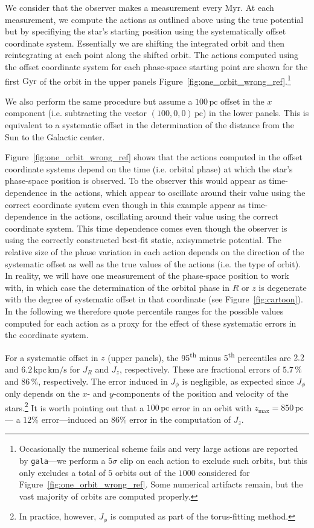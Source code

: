\documentclass[twocolumn]{aastex62}
\newcommand{\pc}{\text{pc}}
\newcommand{\Myr}{\text{Myr}}
\newcommand{\Gyr}{\text{Gyr}}
\newcommand{\kms}{\text{km}/\text{s}}
\newcommand{\actunit}{\text{kpc}\,\kms}
\begin{document}
We consider that the observer makes a measurement every $\Myr$. At
each measurement, we compute the actions as outlined above using the true
potential but by specifiying the star's starting position using the
systematically offset coordinate system. Essentially we are shifting the
integrated orbit and then reintegrating at each point along the shifted orbit. The actions computed using the offset coordinate system
for each phase-space starting point are shown for the first $\Gyr$ of the
orbit in the upper panels
Figure~\ref{fig:one_orbit_wrong_ref}.\footnote{Occasionally the numerical
scheme fails and very large actions are reported by \texttt{gala}---we perform
a $5\sigma$ clip on each action to exclude such orbits, but this only excludes
a total of $5$ orbits out of the $1000$ considered for
Figure~\ref{fig:one_orbit_wrong_ref}. Some numerical artifacts remain, but the
vast majority of orbits are computed properly.}
    
We also perform the same procedure but assume a $100\,\pc$ offset in the $x$
component (i.e. subtracting the vector $(100, 0, 0)\,\pc$) in the lower
panels. This is equivalent to a systematic offset in the determination of the
distance from the Sun to the Galactic center.

Figure~\ref{fig:one_orbit_wrong_ref} shows that the actions computed in the
offset coordinate systems depend on the time (i.e. orbital phase) at which the
star's phase-space position is observed. To the observer this would
appear as time-dependence in the actions, which appear to oscillate around
their value using the correct coordinate system even though in this example
appear as time-dependence in the actions, oscillating around
their value using the correct coordinate system. This time dependence comes even though
the observer is using the correctly constructed best-fit static, axisymmetric
potential. The relative size of the phase variation in each action depends on
the direction of the systematic offset as well as the true values of the
actions (i.e. the type of orbit). In reality, we will have one measurement of
the phase-space position to work with, in which case the determination of the
orbital phase in $R$ or $z$ is degenerate with the degree of systematic offset
in that coordinate (see Figure~\ref{fig:cartoon}).  In the following we
therefore quote percentile ranges for the possible values computed for each
action as a proxy for the effect of these systematic errors in the coordinate
system.

For a systematic offset in $z$ (upper panels), the 95\textsuperscript{th}
minus 5\textsuperscript{th} percentiles are $2.2$ and $6.2\,\actunit$ for
$J_R$ and $J_z$, respectively. These are fractional errors of $5.7\,\%$ and
$86\,\%$, respectively. The error induced in $J_{\phi}$ is negligible, as
expected since $J_{\phi}$ only depends on the $x$- and $y$-components of the
position and velocity of the stars.\footnote{In practice, however, $J_{\phi}$
is computed as part of the torus-fitting method.} It is worth pointing out
that a $100\,\pc$ error in an orbit with $z_{\text{max}}=850\,\pc$ --- a
$12\%$ error---induced an $86\%$ error in the computation of $J_z$.
\end{document}
